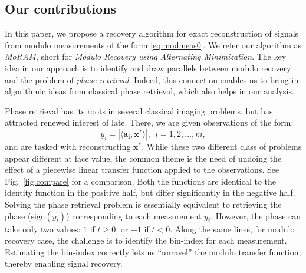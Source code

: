 \subsection{Our contributions}
In this paper, we propose a recovery algorithm for exact reconstruction of signals from modulo measurements of the form \eqref{eq:modmeas0}. We refer our algorithm as \emph{MoRAM}, short for \emph{Modulo Recovery using Alternating Minimization}. The key idea in our approach is to identify and draw parallels between modulo recovery and the problem of \emph{phase retrieval}. Indeed, this connection enables us to bring in algorithmic ideas from classical phase retrieval, which also helps in our analysis. 

Phase retrieval has its roots in several classical imaging problems, but has attracted renewed interest of late. There, we are given observations of the form:
\[
y_i= | \langle \mathbf{a_i} , \mathbf{x^*} \rangle|,~~i = 1, 2, \ldots, m,
\]
and are tasked with reconstructing $\mathbf{x^*}$.  While these two different class of problems appear different at face value, the common theme is the need of undoing the effect of a piecewise linear transfer function applied to the observations. See Fig.~\ref{fig:compare} for a comparison.
Both the functions are identical to the identity function in the positive half, but differ significantly in the negative half. Solving the phase retrieval problem is essentially equivalent to retrieving the phase ($\text{sign}\left(y_i\right)$) corresponding to each measurement $y_i$. However, the phase can take only two values: $1$ if $t \geq 0$, or $-1$ if $t < 0$. Along the same lines, for modulo recovery case, the challenge is to identify the bin-index for each measurement. %
Estimating the bin-index correctly lets us ``unravel'' the modulo transfer function, thereby enabling signal recovery.
